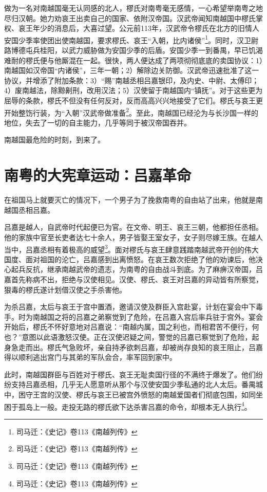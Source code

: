 做为一名对南越国毫无认同感的北人，樛氏对南粤毫无感情，一心希望举南粤之地尽归汉朝。她力劝哀王出卖自己的国家、依附汉帝国。汉武帝闻知南越国中樛氏掌权、哀王年少的消息后，大喜过望。公元前113年，汉武帝令樛氏在北方的旧情人安国少季率使团出使南越国，要求樛氏、哀王“入朝，比内诸侯”\footnote{司马迁：《史记》卷113《南越列传》}。同时，汉卫尉路博德屯兵桂阳，以武力威胁做为安国少季的后盾。安国少季一到番禺，早已饥渴难耐的樛氏便与他厮混在一起。很快，两人便达成了两项彻彻底底的卖国协议：1）南越国如汉帝国“内诸侯”，三年一朝；2）解除边关防御。汉武帝迅速批准了这一协议，并增添了附加条款：3）“赐”南越丞相吕嘉银印，及内史、中尉、太傅印；4）废南越法，除黥劓刑，改用汉法；5）汉使留于南越国内“镇抚”。对于这些更为屈辱的条款，樛氏不但没有任何反对，反而高高兴兴地接受了它们。樛氏与哀王更开始整饬行装，为“入朝”汉武帝做准备\footnote{司马迁：《史记》卷113《南越列传》}。至此，南越国已经沦为与长沙国一样的地位，失去了一切的自主能力，几乎等同于被汉帝国吞并。

南越国最危险的时刻，到来了。

\section{南粤的大宪章运动：吕嘉革命}

在祖国马上就要灭亡的情况下，一个男子为了挽救南粤的自由站了出来，他就是南越国丞相吕嘉。

吕嘉是越人，自武帝时代起便已为官。在文帝、明王、哀王三朝，他都担任丞相。他的家族中官至长吏者达七十余人，男子皆娶王室女子，女子则尽嫁王族。在越人当中，吕嘉丞相有着极高的威望\footnote{司马迁：《史记》卷113《南越列传》}。面对樛氏与哀王肆意践踏南越武帝开创的伟大国度、面对祖国的沦亡，吕嘉感到出离愤怒。在哀王数次拒绝了他的劝谏后，他决心起兵反抗，继承南越武帝的遗志，为南粤的自由战斗到底。为了麻痹汉帝国，吕嘉首先称病不出，拒绝与汉使相见。汉使、樛氏、哀王对吕嘉的异动皆有所察觉，狠毒的樛氏遂计划借汉使之手杀害他。

为杀吕嘉，太后与哀王于宫中置酒，邀请汉使及群臣入宫赴宴，计划在宴会中下毒手。时为南越国之将的吕嘉之弟察觉到了危险，在吕嘉入宫后率兵驻于宫外。宴会开始后，樛氏不怀好意地对吕嘉说：“南越内属，国之利也，而相君苦不便行，何也？”意图以此语激怒汉使。正在汉使迟疑之间，警觉的吕嘉已察觉到了危险，起身急走而出。樛氏气急败坏，亲自持矛欲刺吕嘉，却被尚存良知的哀王阻止，吕嘉得以顺利逃出宫门与其弟的军队会合，率军回到家中。

此时，南越国群臣与百姓对于樛氏、哀王无耻卖国行径的不满终于爆发了。他们纷纷支持吕嘉丞相，几乎无人愿意听从那个与汉使安国少季私通的北人太后。番禺城中，困守王宫的汉使、樛氏与哀王已被宫外愤怒的南越爱国者们彻底包围，如同坐困于孤岛上一般。走投无路的樛氏欲下达杀害吕嘉的命令，却根本无人执行\footnote{司马迁：《史记》卷113《南越列传》}。

